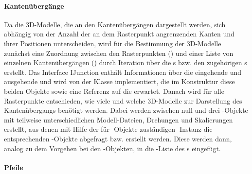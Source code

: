 \paragraph{Kantenübergänge}

Da die 3D-Modelle, die an den Kantenübergängen dargestellt werden, sich abhängig von der Anzahl der an dem Rasterpunkt angrenzenden Kanten und ihrer Positionen unterscheiden, wird für die Bestimmung der 3D-Modelle zunächst eine Zuordnung zwischen den Rasterpunkten () und einer Liste von einzelnen Kantenübergängen () durch Iteration über die s bzw. den zugehörigen s erstellt. Das Interface IJunction enthält Informationen über die eingehende und ausgehende  und wird von der Klasse  implementiert, die im Konstruktur diese beiden Objekte sowie eine Referenz auf die  erwartet.
\newline\newline
Danach wird für alle Rasterpunkte entschieden, wie viele und welche 3D-Modelle zur Darstellung des Kantenübergangs benötigt werden. Dabei werden zwischen null und drei -Objekte mit teilweise unterschiedlichen Modell-Dateien, Drehungen und Skalierungen erstellt, aus denen mit Hilfe der für -Objekte zuständigen -Instanz die entsprechenden -Objekte abgefragt bzw. erstellt werden. Diese werden dann, analog zu dem Vorgehen bei den -Objekten, in die -Liste des s eingefügt.

\paragraph{Pfeile}

